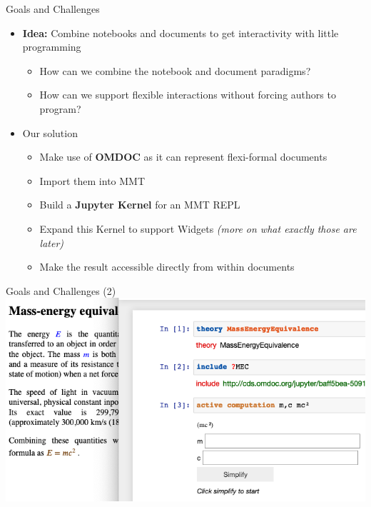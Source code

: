 \documentclass{beamer}
\begin{document}
    \begin{frame}{Goals and Challenges}
        \begin{itemize}
            \item \textbf{Idea:} Combine notebooks and documents to get interactivity with little programming
            \begin{itemize}
                \item How can we combine the notebook and document paradigms?
                \item How can we support flexible interactions without forcing authors to program?
            \end{itemize}

            \item Our solution
            \begin{itemize}
                \item Make use of \textbf{OMDOC} as it can represent flexi-formal documents
                \item Import them into MMT
                \item Build a \textbf{Jupyter Kernel} for an MMT REPL
                \item Expand this Kernel to support Widgets \textit{(more on what exactly those are later)}
                \item Make the result accessible directly from within documents
            \end{itemize}
        \end{itemize}
    \end{frame}

    \begin{frame}[fragile]{Goals and Challenges (2) }
        \includegraphics[scale=0.5]{images/acwidget}
    \end{frame}
    
\end{document}
